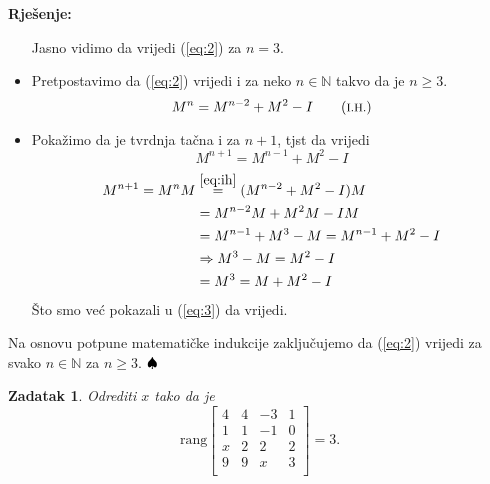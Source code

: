 \documentclass{article}
\newcommand{\com}[1]{\tag{\textrm{\footnotesize #1}}}
\newtheorem{theorem}{\textbf{Zadatak}}
\newenvironment{solution}{\noindent\textbf{Rje\v senje:\newline}}{$\hfill\spadesuit$}
\begin{document}
\begin{solution}
\begin{itemize}
        Jasno vidimo da vrijedi (\ref{eq:2}) za $n=3$.
        \item Pretpostavimo da (\ref{eq:2}) vrijedi i za neko $n\in\mathbb{N}$ takvo da je $n\geq 3$.
        \begin{equation}
            \label{eq:ih}
            M^n=M^{n-2}+M^2-I\com{I.H.}
        \end{equation}
        \item Poka\v zimo da je tvrdnja ta\v cna i za $n+1$, tjst da vrijedi
        $$M^{n+1}=M^{n-1}+M^2-I$$
        \begin{equation*}
            \begin{aligned}
                M^{n+1}=M^nM    &\overset{\ref{eq:ih}}{=} (M^{n-2}+M^2-I)M \\
                                &= M^{n-2}M+M^2M-IM \\
                                &= M^{n-1}+M^3-M=M^{n-1}+M^2-I \\
                                &\Rightarrow M^3-M=M^2-I \\
                                &= M^3=M+M^2-I
            \end{aligned}
        \end{equation*}
        \v Sto smo ve\' c pokazali u (\ref{eq:3}) da vrijedi.
    \end{itemize}
    Na osnovu potpune matemati\v cke indukcije zaklju\v cujemo da (\ref{eq:2}) vrijedi za svako $n\in\mathbb{N}$ za $n\geq 3$.
\end{solution}

\begin{theorem}
    Odrediti $x$ tako da je
    $$\text{rang}\left[
        \begin{array}{cccc}
            4 & 4 & -3 & 1 \\
            1 & 1 & -1 & 0 \\
            x & 2 & 2 & 2 \\
            9 & 9 & x & 3 \\
        \end{array}
    \right]=3.$$
\end{theorem}
\end{document}
